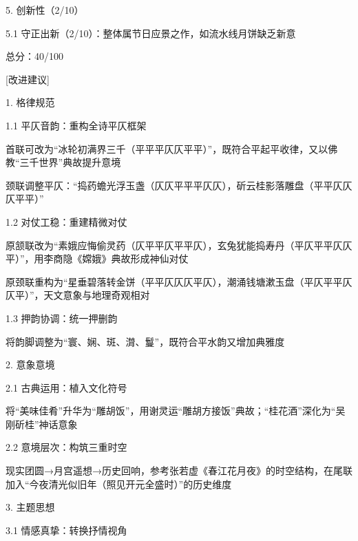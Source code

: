\begin{tcolorbox}[
  breakable,            %
  colback=white, %
  colframe=black, 
  boxrule=1pt,        %
  arc=0mm             %
  ]
  5. 创新性（2/10）\par
  \hspace{2em}5.1 守正出新（2/10）：整体属节日应景之作，如流水线月饼缺乏新意\par
  总分：40/100

  [改进建议]\par
  1. 格律规范\par
  \hspace{2em}1.1 平仄音韵：重构全诗平仄框架\par
  \hspace{2em}首联可改为“冰轮初满界三千（平平平仄仄平平）”，既符合平起平收律，又以佛教“三千世界”典故提升意境\par
  \hspace{2em}颈联调整平仄：“捣药蟾光浮玉盏（仄仄平平平仄仄），斫云桂影落雕盘（平平仄仄仄平平）”\par
  \hspace{2em}1.2 对仗工稳：重建精微对仗\par
  \hspace{2em}原颔联改为“素娥应悔偷灵药（仄平平仄平平仄），玄兔犹能捣寿丹（平仄平平仄仄平）”，用李商隐《嫦娥》典故形成神仙对仗\par
  \hspace{2em}原颈联重构为“星垂碧落转金饼（平平仄仄仄平仄），潮涌钱塘漱玉盘（平仄平平仄仄平）”，天文意象与地理奇观相对\par
  \hspace{2em}1.3 押韵协调：统一押删韵\par
  \hspace{2em}将韵脚调整为“寰、娴、斑、潸、鬘”，既符合平水韵又增加典雅度\par
  2. 意象意境\par
  \hspace{2em}2.1 古典运用：植入文化符号\par
  \hspace{2em}将“美味佳肴”升华为“雕胡饭”，用谢灵运“雕胡方接饭”典故；“桂花酒”深化为“吴刚斫桂”神话意象\par
  \hspace{2em}2.2 意境层次：构筑三重时空\par
  \hspace{2em}现实团圆→月宫遥想→历史回响，参考张若虚《春江花月夜》的时空结构，在尾联加入“今夜清光似旧年（照见开元全盛时）”的历史维度\par
  3. 主题思想\par
  \hspace{2em} 3.1 情感真挚：转换抒情视角\par

\end{tcolorbox}
